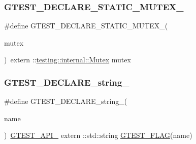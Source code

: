 \subsubsection{\texorpdfstring{GTEST\_DECLARE\_STATIC\_MUTEX\_}{GTEST\_DECLARE\_STATIC\_MUTEX\_}}
{\footnotesize\ttfamily \#define G\+T\+E\+S\+T\+\_\+\+D\+E\+C\+L\+A\+R\+E\+\_\+\+S\+T\+A\+T\+I\+C\+\_\+\+M\+U\+T\+E\+X\+\_\+(\begin{DoxyParamCaption}\item[{}]{mutex }\end{DoxyParamCaption})~extern \+::\mbox{\hyperlink{classtesting_1_1internal_1_1_mutex}{testing\+::internal\+::\+Mutex}} mutex}

\mbox{\label{_obj__test_2lib_2googletest-master_2googletest_2include_2gtest_2internal_2gtest-port_8h_a9f74eee05f7ee5534139a622fe7da7dd}} 
\subsubsection{\texorpdfstring{GTEST\_DECLARE\_string\_}{GTEST\_DECLARE\_string\_}}
{\footnotesize\ttfamily \#define G\+T\+E\+S\+T\+\_\+\+D\+E\+C\+L\+A\+R\+E\+\_\+string\+\_\+(\begin{DoxyParamCaption}\item[{}]{name }\end{DoxyParamCaption})~\mbox{\hyperlink{_obj__test_2lib_2googletest-release-1_88_81_2googletest_2include_2gtest_2internal_2gtest-port_8h_aa73be6f0ba4a7456180a94904ce17790}{G\+T\+E\+S\+T\+\_\+\+A\+P\+I\+\_\+}} extern \+::std\+::string \mbox{\hyperlink{_obj__test_2lib_2googletest-release-1_88_81_2googletest_2include_2gtest_2internal_2gtest-port_8h_a828f4e34a1c4b510da50ec1563e3562a}{G\+T\+E\+S\+T\+\_\+\+F\+L\+AG}}(name)}

\mbox{\label{_obj__test_2lib_2googletest-master_2googletest_2include_2gtest_2internal_2gtest-port_8h_a491d09ee62f1c9cfeafa3dbf75aaa9e2}} 
